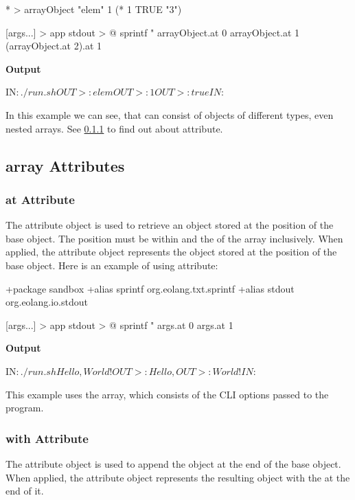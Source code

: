 \documentclass[12pt]{book}
\begin{document}
{{{\begin{ffcode}
* > arrayObject
  "elem"
  1
  (* 1 TRUE "3")

[args...] > app
  stdout > @
    sprintf
      "%
      arrayObject.at 0
      arrayObject.at 1
      (arrayObject.at 2).at 1
\end{ffcode}
\textbf{Output}
\begin{ffcode}
IN$: ./run.sh
OUT>: elem
OUT>: 1
OUT>: true
IN$:
\end{ffcode}
In this example we can see, that  can consist of objects of different types, even nested arrays. See \ref{subsubsec:at-attr} to find out about  attribute.

\subsection{array Attributes}

\subsubsection{at Attribute} \label{subsubsec:at-attr}
The  attribute object is used to retrieve an object stored at the position  of the base  object.
The position  must be within  and the  of the array inclusively.
When applied, the  attribute object represents the object stored at the position  of the base  object. Here is an example of using  attribute:

\begin{ffcode}
+package sandbox
+alias sprintf org.eolang.txt.sprintf
+alias stdout org.eolang.io.stdout

[args...] > app
  stdout > @
    sprintf
      "%
      args.at 0
      args.at 1
\end{ffcode}
\textbf{Output}
\begin{ffcode}
IN$: ./run.sh Hello, World!
OUT>: Hello,
OUT>: World!
IN$:
\end{ffcode}

This example uses the  array, which consists of the CLI options passed to the program.

\subsubsection{with Attribute}
The  attribute object is used to append the  object at the end of the base  object.
When applied, the  attribute object represents the resulting  object with the  at the end of it.

}}}
\end{document}
